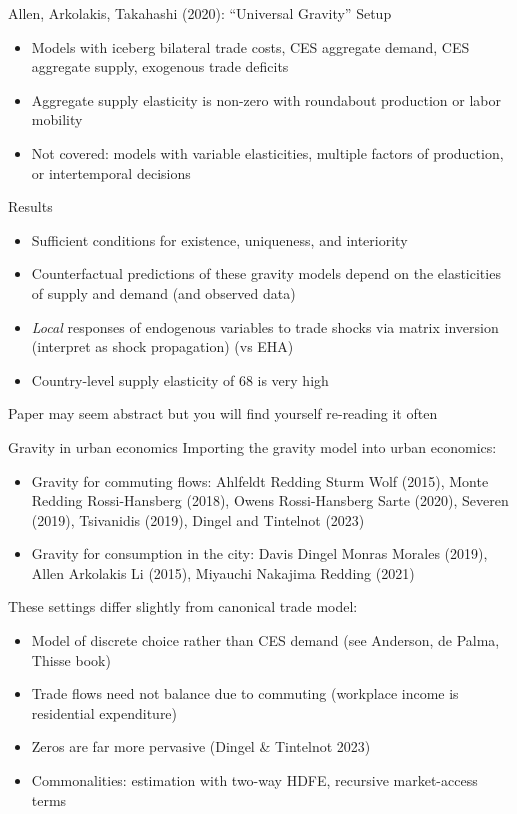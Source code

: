 \documentclass[10pt,notes=hide,aspectratio=169]{beamer}
\begin{document}
\begin{frame}{Allen, Arkolakis, Takahashi (2020): ``Universal Gravity''}
Setup
\begin{itemize}
\item Models with iceberg bilateral trade costs, CES aggregate demand, CES aggregate supply, exogenous trade deficits
\item Aggregate supply elasticity is non-zero with roundabout production or labor mobility
\item Not covered: models with variable elasticities, multiple factors of production, or intertemporal decisions
\end{itemize}
Results
\begin{itemize}
\item Sufficient conditions for existence, uniqueness, and interiority
\item Counterfactual predictions of these gravity models depend on the elasticities of supply and demand (and observed data)
\item \textit{Local} responses of endogenous variables to trade shocks via matrix inversion
(interpret as shock propagation)
(vs EHA)
\item Country-level supply elasticity of 68 is very high
\end{itemize}
Paper may seem abstract but you will find yourself re-reading it often
\end{frame}
\begin{frame}{Gravity in urban economics}
Importing the gravity model into urban economics:
\begin{itemize}
	\item Gravity for commuting flows: 
	Ahlfeldt Redding Sturm Wolf (2015), Monte Redding Rossi-Hansberg (2018), Owens Rossi-Hansberg Sarte (2020), Severen (2019), Tsivanidis (2019), Dingel and Tintelnot (2023)
	\item Gravity for consumption in the city:
	Davis Dingel Monras Morales (2019), Allen Arkolakis Li (2015), Miyauchi Nakajima Redding (2021)
\end{itemize}
These settings differ slightly from canonical trade model: 
\begin{itemize}
	\item Model of discrete choice rather than CES demand (see Anderson, de Palma, Thisse book)
	\item Trade flows need not balance due to commuting (workplace income is residential expenditure)
	\item Zeros are far more pervasive (Dingel \& Tintelnot 2023)
	\item Commonalities: estimation with two-way HDFE, recursive market-access terms
\end{itemize}
\end{frame}
\end{document}
